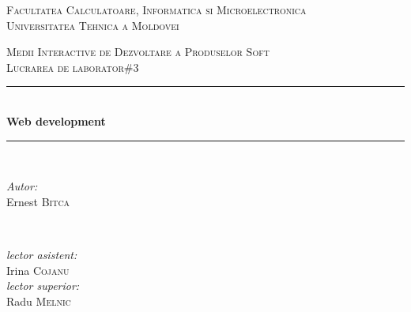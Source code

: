 \begin{titlepage}

\begin{center} %

\textsc{\large Facultatea Calculatoare, Informatica si Microelectronica}\\[0.5cm]
\textsc{\large Universitatea Tehnica a Moldovei}\\[1.2cm] %
\vspace{25 mm}

\textsc{\Large Medii Interactive de Dezvoltare a Produselor Soft}\\[0.5cm] %
\textsc{\large Lucrarea de laborator\#3}\\[0.5cm] %

\newcommand{\HRule}{\rule{\linewidth}{0.5mm}} %

\vspace{10 mm}
\HRule \\[0.4cm]
{ \LARGE \bfseries Web development  }\\[0.4cm] %
\HRule \\[1.5cm]

\vspace{30mm}

\begin{minipage}{0.4\textwidth}
\begin{flushleft} \large
\emph{Autor:}\\
		Ernest \textsc{Bitca}
		\end{flushleft}
		\end{minipage}
		~
		\begin{minipage}{0.4\textwidth}
		\begin{flushright} \large
		\emph{lector asistent:} \\
			Irina \textsc{Cojanu} \\ %
			\emph{lector superior:} \\
				Radu \textsc{Melnic} %
				\end{flushright}
				\end{minipage}\\[4cm]


\end{center}
\end{titlepage}

